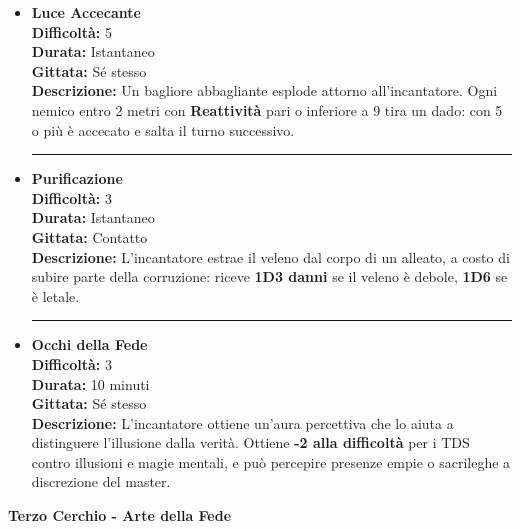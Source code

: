 \documentclass[../manuale_main.tex]{subfiles}
\begin{document}
\begin{itemize}

\item \textbf{Luce Accecante} \\
\textbf{Difficoltà:} 5 \\
\textbf{Durata:} Istantaneo \\
\textbf{Gittata:} Sé stesso \\
\textbf{Descrizione:} Un bagliore abbagliante esplode attorno all’incantatore. Ogni nemico entro 2 metri con \textbf{Reattività} pari o inferiore a 9 tira un dado: con 5 o più è accecato e salta il turno successivo.

\vspace{0.5cm}\rule{\textwidth}{0.4pt}\vspace{1cm}

\item \textbf{Purificazione} \\
\textbf{Difficoltà:} 3 \\
\textbf{Durata:} Istantaneo \\
\textbf{Gittata:} Contatto \\
\textbf{Descrizione:} L’incantatore estrae il veleno dal corpo di un alleato, a costo di subire parte della corruzione: riceve \textbf{1D3 danni} se il veleno è debole, \textbf{1D6} se è letale.

\vspace{0.5cm}\rule{\textwidth}{0.4pt}\vspace{1cm}

\item \textbf{Occhi della Fede} \\
\textbf{Difficoltà:} 3 \\
\textbf{Durata:} 10 minuti \\
\textbf{Gittata:} Sé stesso \\
\textbf{Descrizione:} L’incantatore ottiene un’aura percettiva che lo aiuta a distinguere l’illusione dalla verità. Ottiene \textbf{-2 alla difficoltà} per i TDS contro illusioni e magie mentali, e può percepire presenze empie o sacrileghe a discrezione del master.


\end{itemize}

\clearpage
\vspace{0.2cm}
{\zarafirtitlefont\Large\bfseries Terzo Cerchio - Arte della Fede}
\end{document}
